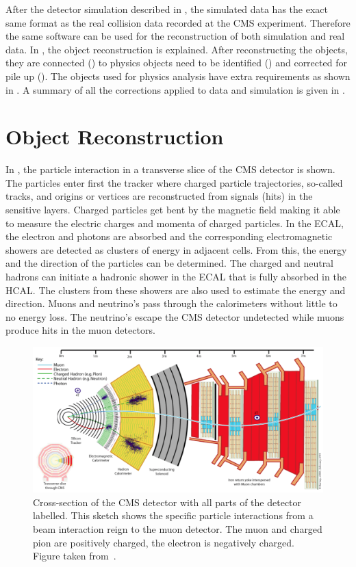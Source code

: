 After the detector simulation described in , the simulated data has the exact same format as the real collision data recorded at the CMS experiment. Therefore the same software can be used for the reconstruction of both simulation and real data. In , the object reconstruction is explained. After reconstructing the objects, they are connected () to physics objects need to be identified () and corrected for pile up (). The objects used for physics analysis have extra requirements as shown in . A summary of all the corrections applied to data and simulation is given in .

\section{Object Reconstruction}
\label{sec:reco}
In , the particle interaction in a transverse slice of the CMS detector is shown. The particles enter first the tracker where charged particle trajectories, so-called tracks, and origins or vertices are reconstructed from signals (hits) in the sensitive layers. Charged particles get bent by the magnetic field making it able to measure the electric charges and momenta of charged particles. In the ECAL, the electron and photons are absorbed and the corresponding electromagnetic showers are detected as clusters of energy in adjacent  cells. From this, the energy and the direction of the particles can be determined. The charged and neutral hadrons can initiate a hadronic shower in the ECAL that is fully absorbed in the HCAL. The clusters from these showers are also used to estimate the energy and direction. Muons and neutrino's pass through the calorimeters without little to no energy loss. The neutrino's escape the CMS detector undetected while muons produce hits in the muon detectors. 
\begin{figure}
	\centering
	\includegraphics[width=1.\linewidth]{4_EventRecoSelect/Figures/transversecms}
	\caption{Cross-section of the CMS detector with all parts of the detector labelled. This sketch shows the specific particle interactions from a beam interaction reign to the muon detector. The muon and charged pion are positively charged, the electron is negatively charged. Figure taken from~\cite{CMS-PRF-14-001}. }
	\label{fig:transversecms}
\end{figure}

